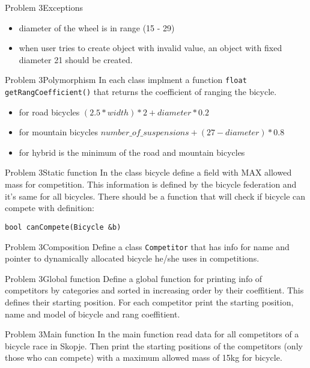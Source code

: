 \begin{frame}{Problem 3}{Exceptions}
\begin{itemize}
  \item diameter of the wheel is in range (15 - 29)
  \item when user tries to create object with invalid value, an object with
  fixed diameter 21 should be created.
\end{itemize}
\end{frame}

\begin{frame}{Problem 3}{Polymorphism}
In each class implment a function \texttt{float getRangCoefficient()} that
returns the coefficient of ranging the bicycle.

\begin{itemize}
  \item for road bicycles $(2.5 * width) * 2 + diameter * 0.2$
  \item for mountain bicycles $number\_of\_suspensions + (27 - diameter) * 0.8$
  \item for hybrid is the minimum of the road and mountain bicycles
\end{itemize}
\end{frame}

\begin{frame}{Problem 3}{Static function}
In the class bicycle define a field with MAX allowed mass for competition. This
information is defined by the bicycle federation and it's same for all bicycles.
There should be a function that will check if bicycle can compete with
definition:

\texttt{bool canCompete(Bicycle \&b)}
\end{frame}

\begin{frame}{Problem 3}{Composition}
Define a class \texttt{Competitor} that has info for name and pointer to
dynamically allocated bicycle he/she uses in competitions.
\end{frame}

\begin{frame}{Problem 3}{Global function}
Define a global function for printing info of competitors by categories and
sorted in increasing order by their coeffitient. This defines their starting
position. For each competitor print the starting position, name and model of
bicycle and rang coeffitient.
\end{frame}

\begin{frame}{Problem 3}{Main function}
In the main function read data for all competitors of a bicycle race in Skopje.
Then print the starting positions of the competitors (only those who can
compete) with a maximum allowed mass of 15kg for bicycle.
\end{frame}

